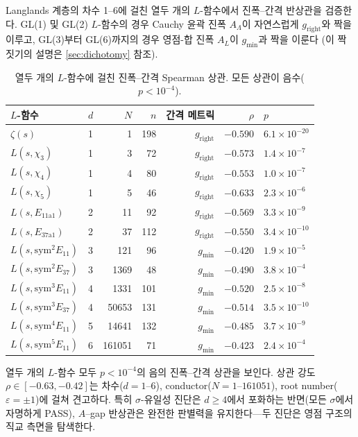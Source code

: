 \documentclass[11pt,a4paper]{article}
\theoremstyle{plain}
\theoremstyle{definition}
\newcommand{\La}{\Lambda}
\begin{document}
Langlands 계층의 차수 1--6에 걸친 열두 개의 $L$-함수에서
진폭--간격 반상관을 검증한다.
GL(1) 및 GL(2) $L$-함수의 경우 Cauchy 윤곽 진폭 $A_\La$이
자연스럽게 $g_{\mathrm{right}}$와 짝을 이루고,
GL(3)부터 GL(6)까지의 경우 영점-합 진폭 $A_L$이
$g_{\min}$과 짝을 이룬다
(이 짝짓기의 설명은 \cref{sec:dichotomy} 참조).

\begin{table}[h]
\centering
\caption{열두 개의 $L$-함수에 걸친 진폭--간격 Spearman 상관.
모든 상관이 음수($p < 10^{-4}$).}
\label{tab:universality}
\begin{tabular}{llrrrrl}
\toprule
\textbf{$L$-함수} & $d$ & $N$ & $n$ &
\textbf{간격 메트릭} & $\rho$ & $p$ \\
\midrule
$\zeta(s)$ & 1 & 1 & 198 & $g_{\mathrm{right}}$ & $-0.590$ & $6.1 \times 10^{-20}$ \\
$L(s,\chi_3)$ & 1 & 3 & 72 & $g_{\mathrm{right}}$ & $-0.573$ & $1.4 \times 10^{-7}$ \\
$L(s,\chi_4)$ & 1 & 4 & 80 & $g_{\mathrm{right}}$ & $-0.553$ & $1.0 \times 10^{-7}$ \\
$L(s,\chi_5)$ & 1 & 5 & 46 & $g_{\mathrm{right}}$ & $-0.633$ & $2.3 \times 10^{-6}$ \\
$L(s,E_{11\mathrm{a}1})$ & 2 & 11 & 92 & $g_{\mathrm{right}}$ & $-0.569$ & $3.3 \times 10^{-9}$ \\
$L(s,E_{37\mathrm{a}1})$ & 2 & 37 & 112 & $g_{\mathrm{right}}$ & $-0.550$ & $3.4 \times 10^{-10}$ \\
$L(s,\mathrm{sym}^2 E_{11})$ & 3 & 121 & 96 & $g_{\min}$ & $-0.420$ & $1.9 \times 10^{-5}$ \\
$L(s,\mathrm{sym}^2 E_{37})$ & 3 & 1369 & 48 & $g_{\min}$ & $-0.490$ & $3.8 \times 10^{-4}$ \\
$L(s,\mathrm{sym}^3 E_{11})$ & 4 & 1331 & 101 & $g_{\min}$ & $-0.520$ & $2.5 \times 10^{-8}$ \\
$L(s,\mathrm{sym}^3 E_{37})$ & 4 & 50653 & 131 & $g_{\min}$ & $-0.514$ & $3.5 \times 10^{-10}$ \\
$L(s,\mathrm{sym}^4 E_{11})$ & 5 & 14641 & 132 & $g_{\min}$ & $-0.485$ & $3.7 \times 10^{-9}$ \\
$L(s,\mathrm{sym}^5 E_{11})$ & 6 & 161051 & 71 & $g_{\min}$ & $-0.423$ & $2.4 \times 10^{-4}$ \\
\bottomrule
\end{tabular}
\end{table}

열두 개의 $L$-함수 모두 $p < 10^{-4}$의 음의 진폭--간격 상관을 보인다.
상관 강도 $\rho \in [-0.63, -0.42]$는 차수($d = 1$--$6$),
conductor($N = 1$--$161051$), root number($\varepsilon = \pm 1$)에 걸쳐 견고하다.
특히 $\sigma$-유일성 진단은 $d \ge 4$에서 포화하는 반면(모든 $\sigma$에서
자명하게 PASS),
$A$--gap 반상관은 완전한 판별력을 유지한다---두 진단은 영점 구조의
직교 측면을 탐색한다.
\end{document}
